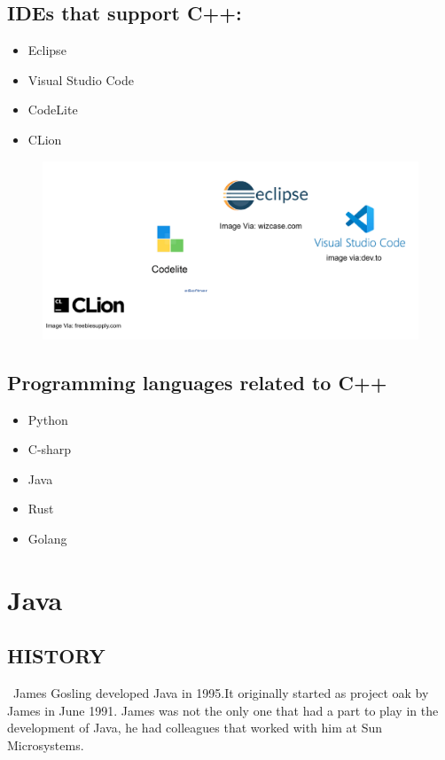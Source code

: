 \documentclass[12pt]{article}
\begin{document}
\newpage

\subsection{IDEs that support C++:}
           \begin{itemize}
           	\item Eclipse
           	\item Visual Studio Code
           	\item CodeLite
           	\item CLion
           \end{itemize}

\begin{figure}[h]
	\includegraphics[width=0.7\linewidth]{"9th pic"}
	\caption{}
	\label{fig:9th-pic}
\end{figure}

\newpage

\subsection{Programming languages related to C++}
           \begin{itemize}
           	\item Python
           	\item C-sharp
           	\item Java
           	\item Rust
           	\item Golang
           \end{itemize}


\newpage

\section{Java}
\subsection{HISTORY}
           \ James Gosling developed Java in 1995.It originally started as project oak by James in June 1991. James was not  the only one that had a part to play in the development of Java, he had colleagues that worked with him at Sun Microsystems.
           
\end{document}
